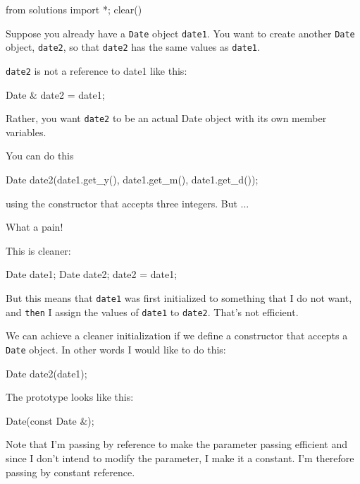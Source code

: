 \begin{python0}
from solutions import *; clear()
\end{python0}

Suppose you already have a \texttt{Date} object \texttt{date1}. You want to
create another \texttt{Date} object, \texttt{date2}, so that \texttt{date2}
has the same values as \texttt{date1}.

\texttt{date2} is not a reference to date1 like this:

\begin{consolethree}[escapeinside=||]
Date & date2 = date1;
\end{consolethree}

Rather, you want \texttt{date2} to be an actual Date object with
its own member variables.

You can do this

\begin{consolethree}[escapeinside=||]
Date date2(date1.get_y(), date1.get_m(), date1.get_d());
\end{consolethree}

using the constructor that accepts three integers. But ...

What a pain!

This is cleaner:

\begin{consolethree}[escapeinside=||]
Date date1;
Date date2;
date2 = date1;
\end{consolethree}

But this means that \texttt{date1} was first initialized to something that
I do not want, and \texttt{then} I assign the values of \texttt{date1} to
\texttt{date2}. That's not efficient.

We can achieve a cleaner initialization if we define a constructor that
accepts a \texttt{Date} object. In other words I would like to do this:

\begin{consolethree}[escapeinside=||]
Date date2(date1);
\end{consolethree}

The prototype looks like this:

\begin{consolethree}[escapeinside=||]
Date(const Date &);
\end{consolethree}

Note that I'm passing by reference to make the parameter passing
efficient and since I don't intend to modify the parameter, I make it a
constant. I'm therefore passing by constant reference.

